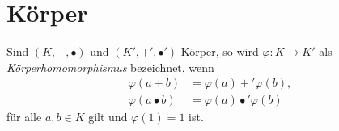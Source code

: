 \section{Körper}
\begin{Definition}
Sind $(K,+,\bullet)$ und $(K',+',\bullet')$ Körper, so
wird $\varphi\colon K\to K'$ als \emph{Körperhomomorphismus}
bezeichnet, wenn
\begin{align}
\varphi(a+b) &= \varphi(a)+'\varphi(b),\\
\varphi(a\bullet b) &= \varphi(a)\bullet'\varphi(b)
\end{align}
für alle $a,b\in K$ gilt und $\varphi(1)=1$ ist.
\end{Definition}



